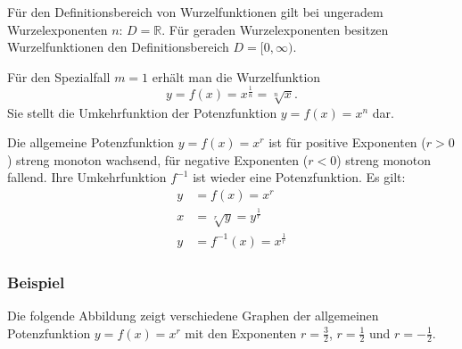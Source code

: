 \begin{center}
\end{center}

Für den Definitionsbereich von Wurzelfunktionen gilt bei ungeradem Wurzelexponenten $n$: $D = \mathbb{R}$. Für geraden Wurzelexponenten besitzen Wurzelfunktionen den Definitionsbereich $D = [0, \infty)$.

Für den Spezialfall $m = 1$ erhält man die Wurzelfunktion
\[ y = f(x) = x^{\frac{1}{n}} = \sqrt[n]{x} . \]
Sie stellt die Umkehrfunktion der Potenzfunktion $y = f(x) = x^n$ dar.

Die allgemeine Potenzfunktion $y = f(x) = x^r$ ist für positive Exponenten ($r > 0$) streng monoton wachsend, für negative Exponenten ($r < 0$) streng monoton fallend. Ihre Umkehrfunktion $f^{-1}$ ist wieder eine Potenzfunktion. Es gilt:
\begin{align*}
  y &= f(x) = x^r\\
  x &= \sqrt[r]{y} = y^{\frac{1}{r}}\\
  y &= f^{-1}(x) = x^{\frac{1}{r}}
\end{align*}

\subsubsection{Beispiel}

Die folgende Abbildung zeigt verschiedene Graphen der allgemeinen Potenzfunktion $y = f(x) = x^r$ mit den Exponenten $r = \tfrac{3}{2}$, $r = \tfrac{1}{2}$ und $r = -\tfrac{1}{2}$.

\begin{center}
\end{center}\beispielende

